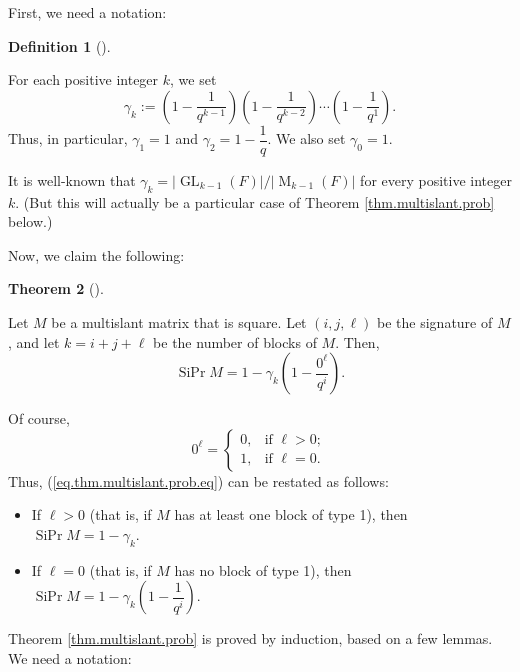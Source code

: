 \documentclass[numbers=enddot,12pt,final,onecolumn,notitlepage]{scrartcl}%
\theoremstyle{definition}
\newtheorem{theo}{Theorem}[section]
\newenvironment{theorem}[1][]
{\begin{theo}[#1]\begin{leftbar}}
{\end{leftbar}\end{theo}}
\newtheorem{defi}[theo]{Definition}
\newenvironment{definition}[1][]
{\begin{defi}[#1]\begin{leftbar}}
{\end{leftbar}\end{defi}}
\theoremstyle{plainsl}
\begin{document}
First, we need a notation:

\begin{definition}
\label{def.gammak}For each positive integer $k$, we set%
\[
\gamma_{k}:=\left(  1-\dfrac{1}{q^{k-1}}\right)  \left(  1-\dfrac{1}{q^{k-2}%
}\right)  \cdots\left(  1-\dfrac{1}{q^{1}}\right)  .
\]
Thus, in particular, $\gamma_{1}=1$ and $\gamma_{2}=1-\dfrac{1}{q}$. We also
set $\gamma_{0}=1$.
\end{definition}

It is well-known that $\gamma_{k}=\left\vert \operatorname*{GL}\nolimits_{k-1}%
\left(  F\right)  \right\vert /\left\vert \operatorname*{M}\nolimits_{k-1}%
\left(  F\right)  \right\vert $ for every positive integer $k$. (But this will
actually be a particular case of Theorem \ref{thm.multislant.prob} below.)

Now, we claim the following:

\begin{theorem}
\label{thm.multislant.prob}Let $M$ be a multislant matrix that is square. Let
$\left(  i,j,\ell\right)  $ be the signature of $M$, and let $k=i+j+\ell$ be
the number of blocks of $M$. Then,%
\begin{equation}
\operatorname*{SiPr}M=1-\gamma_{k}\left(  1-\dfrac{0^{\ell}}{q^{i}}\right)  .
\label{eq.thm.multislant.prob.eq}%
\end{equation}

\end{theorem}

Of course,
\[
0^{\ell}=%
\begin{cases}
0, & \text{if }\ell>0;\\
1, & \text{if }\ell=0.
\end{cases}
\]
Thus, (\ref{eq.thm.multislant.prob.eq}) can be restated as follows:

\begin{itemize}
\item If $\ell>0$ (that is, if $M$ has at least one block of type 1), then
$\operatorname*{SiPr}M=1-\gamma_{k}$.

\item If $\ell=0$ (that is, if $M$ has no block of type 1), then
$\operatorname*{SiPr}M=1-\gamma_{k}\left(  1-\dfrac{1}{q^{i}}\right)  $.
\end{itemize}

Theorem \ref{thm.multislant.prob} is proved by induction, based on a few
lemmas. We need a notation:
\end{document}
